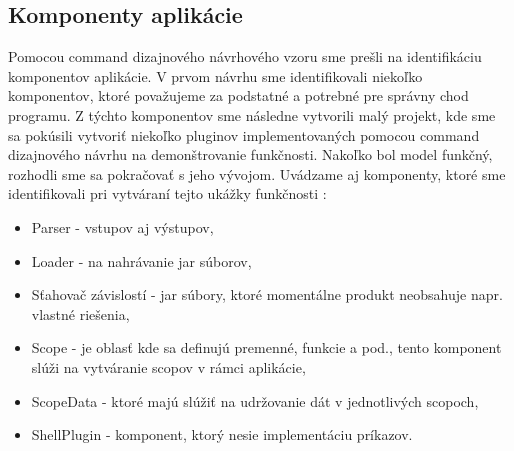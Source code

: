 \subsection{Komponenty aplikácie}
\indent Pomocou command dizajnového návrhového vzoru sme prešli na identifikáciu komponentov aplikácie. V prvom návrhu sme identifikovali niekoľko komponentov, ktoré považujeme za podstatné a potrebné pre správny chod programu. Z týchto komponentov sme následne vytvorili malý projekt, kde sme sa pokúsili vytvoriť niekoľko pluginov implementovaných pomocou command dizajnového návrhu na demonštrovanie funkčnosti. Nakoľko bol model funkčný, rozhodli sme sa pokračovať s jeho vývojom. Uvádzame aj komponenty, ktoré sme identifikovali pri vytváraní tejto ukážky funkčnosti : 
\begin{itemize}
	\item Parser - vstupov aj výstupov,
	\item Loader - na nahrávanie  \acrshort{jar} súborov,
	\item Sťahovač závislostí - \acrshort{jar} súbory, ktoré momentálne produkt neobsahuje napr. vlastné riešenia,
	\item Scope - je oblasť kde sa definujú premenné, funkcie a pod., tento komponent slúži na vytváranie scopov v rámci aplikácie,
	\item ScopeData - ktoré majú slúžiť na udržovanie dát v jednotlivých scopoch,
	\item ShellPlugin - komponent, ktorý nesie implementáciu príkazov.
\end{itemize}

